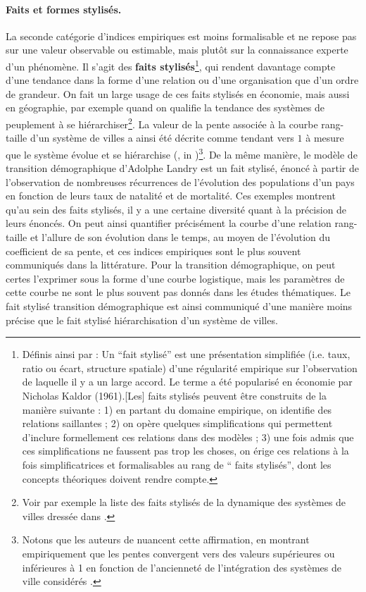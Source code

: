 \paragraph{Faits et formes stylisés.}
La seconde catégorie d'indices empiriques est moins formalisable et ne repose pas sur une valeur observable ou estimable, mais plutôt sur la connaissance experte d'un phénomène.
Il s'agit des \og \textbf{faits stylisés}\fg{}\footnote{
	Définis ainsi par \autocite{livet2014diversite}: \og
	Un ``fait stylisé'' est une présentation simplifiée (i.e. taux, ratio ou écart, structure spatiale) d'une régularité empirique sur l'observation de laquelle il y a un large accord.
	Le terme a été popularisé en économie par Nicholas Kaldor (1961).[Les] faits stylisés peuvent être construits de la manière suivante :
	1) en partant du domaine empirique, on identifie des relations saillantes ;
	2) on opère quelques simplifications qui permettent d'inclure formellement ces relations dans des modèles ;
	3) une fois admis que ces simplifications ne faussent pas trop les choses, on érige ces relations à la fois simplificatrices et formalisables au rang de `` faits stylisés'', dont les concepts théoriques doivent rendre compte.\fg{}
}, qui rendent davantage compte d'une tendance dans la forme d'une relation ou d'une organisation que d'un ordre de grandeur.
On fait un large usage de ces faits stylisés en économie, mais aussi en géographie, par exemple quand on qualifie la tendance des systèmes de peuplement à se hiérarchiser\footnote{
	Voir par exemple la liste des \og faits stylisés de la dynamique des systèmes de villes\fg{} dressée dans \textcite[79-80]{schmitt_modelisation_2014}.
}.
La valeur de la pente associée à la courbe rang-taille d'un système de villes a ainsi été décrite comme tendant vers $1$ à mesure que le système évolue et se hiérarchise (\cite{berry_city_2012}, in \cite[\S9]{pumain_multilevel_2015})\footnote{
	Notons que les auteurs de \textcite{pumain_multilevel_2015} nuancent cette affirmation, en montrant empiriquement que les pentes convergent vers des valeurs supérieures ou inférieures à 1 en fonction de l'ancienneté de l'intégration des systèmes de ville considérés \autocite{cura_old_2017}.
}.
De la même manière, le modèle de transition démographique d'Adolphe Landry est un fait stylisé, énoncé à partir de l'observation de nombreuses récurrences de l'évolution des populations d'un pays en fonction de leurs taux de natalité et de mortalité.
Ces exemples montrent qu'au sein des faits stylisés, il y a une certaine diversité quant à la précision de leurs énoncés.
On peut ainsi quantifier précisément la courbe d'une relation rang-taille et l'allure de son évolution dans le temps, au moyen de l'évolution du coefficient de sa pente, et ces indices empiriques sont le plus souvent communiqués dans la littérature.
Pour la transition démographique, on peut certes l'exprimer sous la forme d'une courbe logistique, mais les paramètres de cette courbe ne sont le plus souvent pas donnés dans les études thématiques.
Le fait stylisé \og transition démographique\fg{} est ainsi communiqué d'une manière moins précise que le fait stylisé \og hiérarchisation d'un système de villes\fg{}.

